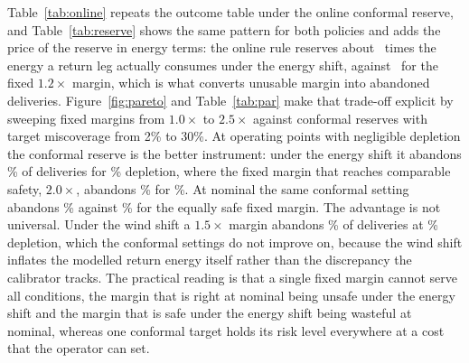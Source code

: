 Table~\ref{tab:online} repeats the outcome table under the online conformal reserve, and Table~\ref{tab:reserve} shows the same pattern for both policies and adds the price of the reserve in energy terms: the online rule reserves about \RCrestcOnlineTightEnergy\ times the energy a return leg actually consumes under the energy shift, against \RCrestcStdTightEnergy\ for the fixed \(1.2\times\) margin, which is what converts unusable margin into abandoned deliveries. Figure~\ref{fig:pareto} and Table~\ref{tab:par} make that trade-off explicit by sweeping fixed margins from \(1.0\times\) to \(2.5\times\) against conformal reserves with target miscoverage from 2\% to 30\%. At operating points with negligible depletion the conformal reserve is the better instrument: under the energy shift it abandons \PsaconlineZeropZeroFiveRthEnergy\% of deliveries for \PsaconlineZeropZeroFiveDepEnergy\% depletion, where the fixed margin that reaches comparable safety, \(2.0\times\), abandons \PsacfixedTwopZeroRthEnergy\% for \PsacfixedTwopZeroDepEnergy\%. At nominal the same conformal setting abandons \PsaconlineZeropZeroFiveRthNominal\% against \PsacfixedTwopZeroRthNominal\% for the equally safe fixed margin. The advantage is not universal. Under the wind shift a \(1.5\times\) margin abandons \PsacfixedOnepFiveRthWind\% of deliveries at \PsacfixedOnepFiveDepWind\% depletion, which the conformal settings do not improve on, because the wind shift inflates the modelled return energy itself rather than the discrepancy the calibrator tracks. The practical reading is that a single fixed margin cannot serve all conditions, the margin that is right at nominal being unsafe under the energy shift and the margin that is safe under the energy shift being wasteful at nominal, whereas one conformal target holds its risk level everywhere at a cost that the operator can set.
